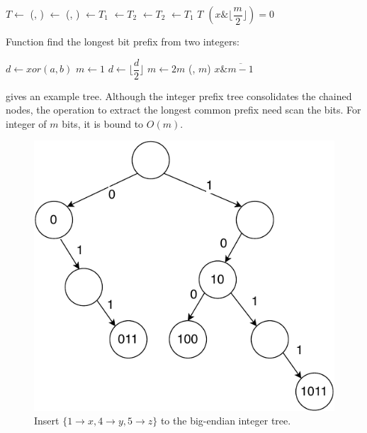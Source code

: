 \documentclass[b5paper]{article}
\begin{document}
\begin{algorithmic}[1]
  \State $T \gets$ 
  \State (, ) $\gets$ (, )
    \State {} $\gets T_1$
    \State {} $\gets T_2$
  \Else
    \State {} $\gets T_2$
    \State {} $\gets T_1$
  \EndIf
  \State \Return $T$
\EndFunction
\Statex
{}
  \State \Return $(x \& \lfloor \dfrac{m}{2} \rfloor) = 0$
\EndFunction
\end{algorithmic}

Function  find the longest bit prefix from two integers:

\begin{algorithmic}[1]
  \State $d \gets xor(a, b)$
  \State $m \gets 1$
    \State $d \gets \lfloor \dfrac{d}{2} \rfloor$
    \State $m \gets 2m$
  \EndWhile
  \State \Return (, $m$)
\EndFunction
\Statex
{}
  \State \Return $x \& \overline{m - 1}$
\EndFunction
\Statex
\end{algorithmic}

 gives an example tree. Although the integer prefix tree consolidates the chained nodes, the operation to extract the longest common prefix need scan the bits. For integer of $m$ bits, it is bound to $O(m)$.

\begin{figure}[htbp]
  \centering
  \includegraphics[scale=0.6, page=8]{img/trie}
  \caption{Insert $\{1 \rightarrow x, 4 \rightarrow y, 5 \rightarrow z\}$ to the big-endian integer tree.}
  \label{fig:int-patricia-haskell-insert}
\end{figure}
\end{document}
